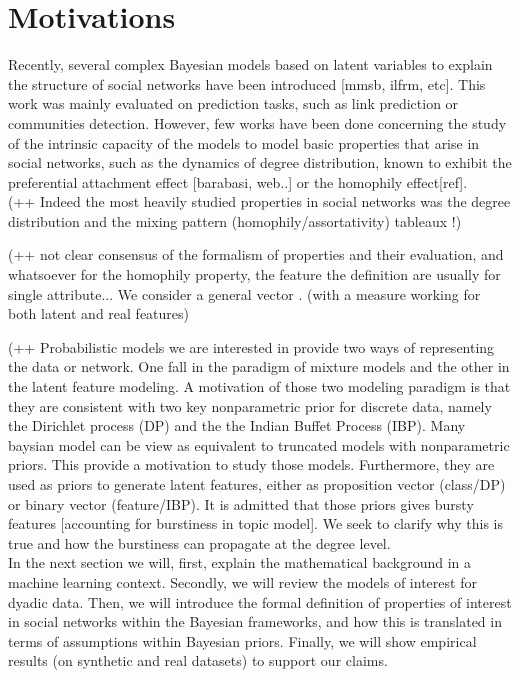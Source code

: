 \section{Motivations}
Recently, several complex Bayesian models based on latent variables to explain the structure of social networks have been introduced [mmsb, ilfrm, etc]. This work was mainly evaluated on prediction tasks, such as link prediction or communities detection. However, few works have been done concerning the study of the intrinsic capacity of the models to model basic properties that arise in social networks, such as the dynamics of degree distribution, known to exhibit the preferential attachment effect [barabasi, web..] or the homophily effect[ref].
~\\


(++ Indeed the most heavily studied properties in social networks was the degree distribution and the mixing pattern (homophily/assortativity) tableaux !)

(++ not clear consensus of the formalism of properties and their evaluation, and whatsoever for the homophily property, the feature the definition are usually for single attribute... We consider a general vector . (with a measure working for both latent and real features)

(++ Probabilistic models we are interested in provide two ways of representing the data or network. One fall in the paradigm of mixture models and the other in the latent feature modeling. A motivation of those two modeling paradigm is that they are consistent with two key nonparametric prior for discrete data, namely the Dirichlet process (DP) and the the Indian Buffet Process (IBP). Many baysian model can be view as equivalent to truncated models with nonparametric priors. This provide a motivation to study those models. Furthermore, they are used as priors to generate latent features, either as proposition vector (class/DP) or binary vector (feature/IBP). It is admitted that those priors gives bursty features [accounting for burstiness in topic model]. We seek to clarify why this is true and how the burstiness can propagate at the degree level.~\\


In the next section we will, first, explain the mathematical background in a machine learning context. Secondly, we will review the models of interest for dyadic data. Then, we will introduce the formal definition of properties of interest in social networks within the Bayesian frameworks, and how this is translated in terms of assumptions within Bayesian priors. Finally, we will show empirical results (on synthetic and real datasets) to support our claims.~\\


